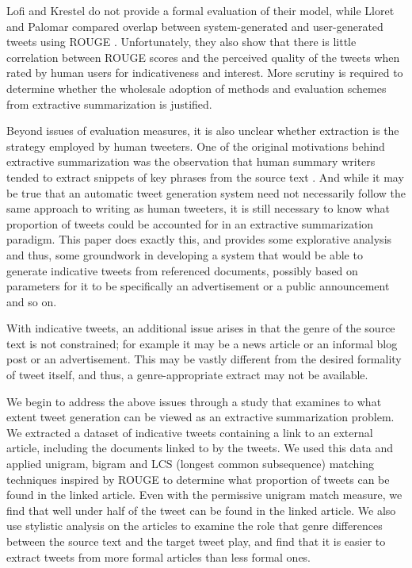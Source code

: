 Lofi and Krestel do not provide a formal evaluation of their model, while Lloret and Palomar compared overlap between system-generated and user-generated tweets using ROUGE 
\cite{lin2004rouge}. Unfortunately, they also show that there is little correlation between ROUGE scores and the perceived quality of the tweets when rated by human users for indicativeness and interest. More scrutiny is required to determine whether the wholesale adoption of methods and evaluation schemes from extractive summarization is justified.

Beyond issues of evaluation measures, it is also unclear whether extraction is the strategy employed by human tweeters. One of the original motivations behind extractive summarization was the observation that human summary writers tended to extract snippets of key phrases from the source text \cite{mani-2001}.  And while it may be true that an automatic tweet generation system need not necessarily follow the same approach to writing as human tweeters, it is still necessary to know what proportion of tweets could be accounted for in an extractive summarization paradigm. This paper does exactly this, and provides some explorative analysis and thus, some groundwork in developing a system that would be able to generate indicative tweets from referenced documents, possibly based on parameters for it to be specifically an advertisement or a public announcement and so on.

With indicative tweets, an additional issue arises in that the genre of the source text is not constrained; for example it may be a news article or an informal blog post or an advertisement. This may be vastly different from the desired formality of tweet itself, and thus, a genre-appropriate extract may not be available.

We begin to address the above issues through a study that examines to what extent tweet generation can be viewed as an extractive summarization problem. We extracted a dataset of indicative tweets containing a link to an external article, including the documents linked to by the tweets. We used this data and applied unigram, bigram and LCS (longest common subsequence) matching techniques inspired by ROUGE to determine what proportion of tweets can be found in the linked article. Even with the permissive unigram match measure, we find that well under half of the tweet can be found in the linked article. We also use stylistic analysis on the articles to examine the role that genre differences between the source text and the target tweet play, and find that it is easier to extract tweets from more formal articles than less formal ones.

